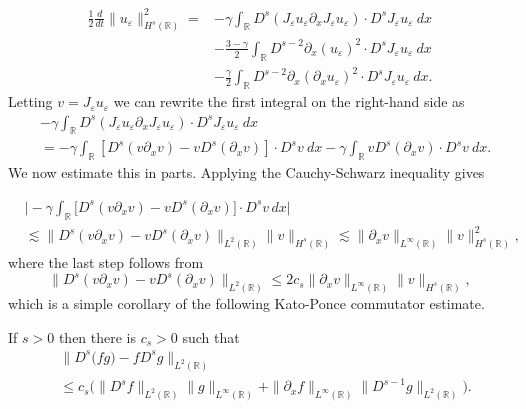 \documentclass{beamer}
\newcommand{\rr}{\mathbb{R}}
\newcommand{\p}{\partial}
\newcommand{\ee}{\varepsilon}
\begin{document}
\begin{frame}
%
%
%
\begin{equation*} \begin{split}
\label{B-moli-int}
 \frac 12
\frac{d}{dt} \|u_\ee \|_{H^s(\rr)}^2
=
& -
\gamma \int_{\rr}  D^s(J_\ee u_\ee \partial_x J_\ee u_\ee) \cdot
D^s J_\ee u_\ee  \  dx
\\
&- \frac{3 -\gamma}{2} \int_{\rr} D^{s-2} \p_x (u_{\ee})^2 \cdot D^s J_\ee 
u_{\ee} \ dx
\\
& - \frac{\gamma}{2} \int_{\rr}  D^{s-2} \p_x (\p_x u_\ee)^2
\cdot D^s J_\ee u_\ee  \ dx.
\end{split}
\end{equation*}
%
%
%
Letting $v=J_\ee u_\ee$ we can rewrite the first integral on the right-hand 
side as 
%
%
%
\begin{equation*} \begin{split}
\label{B-moli-int-v}
& -  \gamma \int_{\rr}   D^s (J_{\ee} u_{\ee} \p_x J_\ee u_\ee)
\cdot D^s
J_{\ee}u_\ee \ dx
\\
& = - \gamma \int_\rr
\left [ D^s(v\p_x v)  -  v D^s (\p_xv)
\right ] \cdot D^s v \ dx
- \gamma \int_\rr
v D^s (\p_xv) 
\cdot D^s v \ dx.
\end{split}
\end{equation*}
%
%
%
%
%
We now estimate this in parts. Applying the Cauchy-Schwarz 
inequality gives
%
%
%
\end{frame}

\begin{frame}

\begin{equation*} \label{int1-est-calc2}
\begin{split}
& \Big|
- \gamma \int_\rr
\big[ D^s(v\p_x v)  -  v D^s (\p_xv)
\big]
\cdot D^s v   \, dx
\Big|
\\
& \lesssim
\|
D^s(v\p_x v)  -  v D^s (\p_xv)
\|_{L^2(\rr)}
\|
v
\|_{H^s(\rr)}
\lesssim \| \p_x v \|_{L^\infty(\rr)} \| v \|_{H^s(\rr)}^2,
\end{split}
\end{equation*}
%
%
%
where the last step follows from 
%
%
%
\begin{equation*} \label{int1-est-calc3}
\| D^s(v\p_x v)  -  v D^s (\p_xv) \|_{L^2(\rr)}
\le
2 c_s    \| \p_x v \|_{L^\infty(\rr)} \| v \|_{H^s(\rr)},
\end{equation*}
%
%
which is a simple corollary of the following Kato-Ponce commutator 
estimate.
%
%
\begin{lemma} \label{KP-lemma}
If  $s>0$ then there is $c_s>0$ such that 
%
%
%
\begin{equation*} \begin{split}
& \| D^{s} \big(fg) -  f D^s g\|_{L^2(\rr)}
\\
& \le
c_s \big(
\| D^{s}f \|_{L^2(\rr)}    \| g \|_{L^\infty(\rr)} 
+ \| \p_xf \|_{L^\infty(\rr)}    \| D^{s-1}g \|_{L^2(\rr)}   \big).
\end{split}
\end{equation*}
%
%
%
\end{lemma}
%
%
\end{frame}
\end{document}
